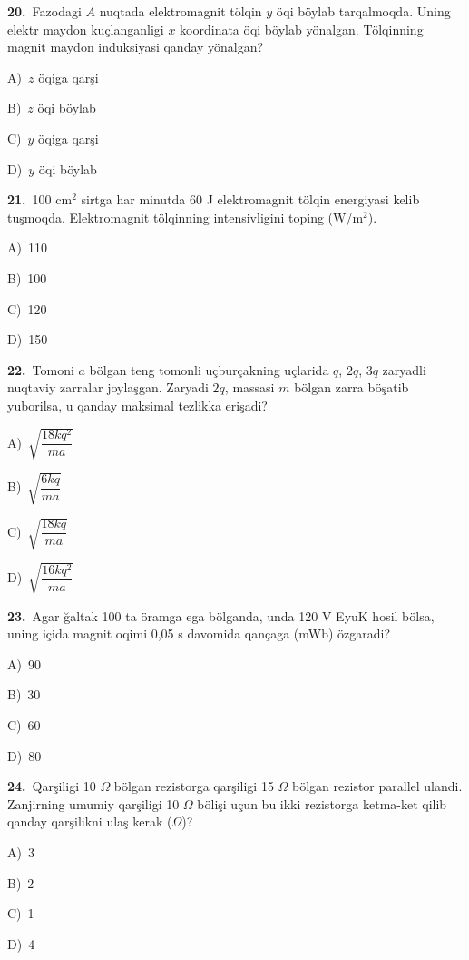 \documentclass[11pt,a4paper]{article}
\newcommand{\opt}[2]{\hspace*{4mm}#1)\ #2\par}
\begin{document}
\noindent\begin{minipage}{\linewidth}
\textbf{20.}\ Fazodagi $A$ nuqtada elektromagnit tölqin $y$ öqi böylab tarqalmoqda. Uning elektr maydon kuçlanganligi $x$ koordinata öqi böylab yönalgan. Tölqinning magnit maydon induksiyasi qanday yönalgan?\par\smallskip
\opt{A}{$z$ öqiga qarşi}
\opt{B}{$z$ öqi böylab}
\opt{C}{$y$ öqiga qarşi}
\opt{D}{$y$ öqi böylab}
\end{minipage}\vspace{9pt}\par
\noindent\begin{minipage}{\linewidth}
\textbf{21.}\ 100 cm$^{2}$ sirtga har minutda 60 J elektromagnit tölqin energiyasi kelib tuşmoqda. Elektromagnit tölqinning intensivligini toping (W/m$^{2}$).\par\smallskip
\opt{A}{110}
\opt{B}{100}
\opt{C}{120}
\opt{D}{150}
\end{minipage}\vspace{9pt}\par
\noindent\begin{minipage}{\linewidth}
\textbf{22.}\ Tomoni $a$ bölgan teng tomonli uçburçakning uçlarida $q$, $2q$, $3q$ zaryadli nuqtaviy zarralar joylaşgan. Zaryadi $2q$, massasi $m$ bölgan zarra böşatib yuborilsa, u qanday maksimal tezlikka erişadi?\par\smallskip
\opt{A}{$\sqrt{\dfrac{18kq^2}{ma}}$}
\opt{B}{$\sqrt{\dfrac{6kq}{ma}}$}
\opt{C}{$\sqrt{\dfrac{18kq}{ma}}$}
\opt{D}{$\sqrt{\dfrac{16kq^2}{ma}}$}
\end{minipage}\vspace{9pt}\par
\noindent\begin{minipage}{\linewidth}
\textbf{23.}\ Agar ğaltak 100 ta öramga ega bölganda, unda 120 V EyuK hosil bölsa, uning içida magnit oqimi 0,05 s davomida qançaga (mWb) özgaradi?\par\smallskip
\opt{A}{90}
\opt{B}{30}
\opt{C}{60}
\opt{D}{80}
\end{minipage}\vspace{9pt}\par
\noindent\begin{minipage}{\linewidth}
\textbf{24.}\ Qarşiligi 10 $\Omega$ bölgan rezistorga qarşiligi 15 $\Omega$ bölgan rezistor parallel ulandi. Zanjirning umumiy qarşiligi 10 $\Omega$ bölişi uçun bu ikki rezistorga ketma-ket qilib qanday qarşilikni ulaş kerak ($\Omega$)?\par\smallskip
\opt{A}{3}
\opt{B}{2}
\opt{C}{1}
\opt{D}{4}
\end{minipage}\vspace{9pt}\par
\end{document}

